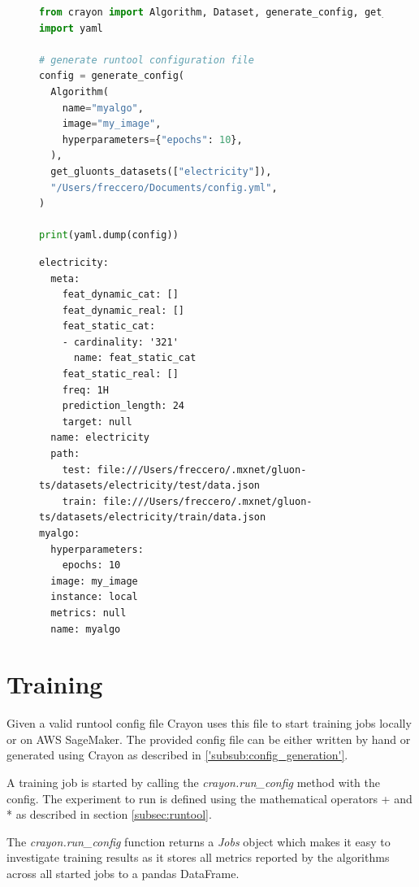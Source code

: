 \begin{figure}[h]
  \begin{lstlisting}[language=Python, label={code:config_generation_gluonts}, caption={Config generation using Crayon with gluonts datasets}]
from crayon import Algorithm, Dataset, generate_config, get_gluonts_datasets
import yaml

# generate runtool configuration file
config = generate_config(
  Algorithm(
    name="myalgo",
    image="my_image",
    hyperparameters={"epochs": 10},
  ),
  get_gluonts_datasets(["electricity"]),
  "/Users/freccero/Documents/config.yml",
)

print(yaml.dump(config))
    \end{lstlisting}
\end{figure}
\begin{figure}
  \begin{lstlisting}[label={output:config_generation_gluonts}, caption={Output when executing Code Fragment \ref{code:config_generation_gluonts}}]
electricity:
  meta:
    feat_dynamic_cat: []
    feat_dynamic_real: []
    feat_static_cat:
    - cardinality: '321'
      name: feat_static_cat
    feat_static_real: []
    freq: 1H
    prediction_length: 24
    target: null
  name: electricity
  path:
    test: file:///Users/freccero/.mxnet/gluon-ts/datasets/electricity/test/data.json
    train: file:///Users/freccero/.mxnet/gluon-ts/datasets/electricity/train/data.json
myalgo:
  hyperparameters:
    epochs: 10
  image: my_image
  instance: local
  metrics: null
  name: myalgo
    \end{lstlisting}
\end{figure}





\section{Training}
Given a valid runtool config file Crayon uses this file to start training jobs locally or on AWS SageMaker. The provided config file can be either written by hand or generated using Crayon as described in \ref{'subsub:config_generation'}.

A training job is started by calling the \textit{crayon.run\_config} method with the config. The experiment to run is defined using the mathematical operators + and * as described in section \ref{subsec:runtool}.

The \textit{crayon.run\_config} function returns a \textit{Jobs} object which makes it easy to investigate training results as it stores all metrics reported by the algorithms across all started jobs to a pandas DataFrame.

